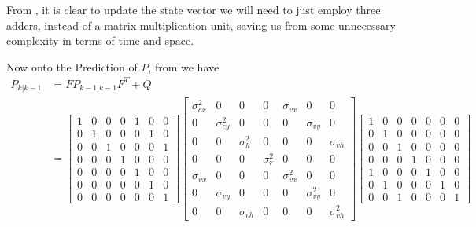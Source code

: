 \documentclass[10pt]{article}
\begin{document}
    \noindent From , it is clear to update the state vector we will need to just employ three adders, instead of 
    a matrix multiplication unit, saving us from some unnecessary complexity in terms of time and space.

    \noindent Now onto the Prediction of \(P\), from  we have
    \begin{align*}
        P_{k|k-1} &= FP_{k-1|k-1}F^T + Q  \\
        &=  \begin{bmatrix}
            1 & 0 & 0 & 0 & 1 & 0 & 0 \\
            0 & 1 & 0 & 0 & 0 & 1 & 0 \\
            0 & 0 & 1 & 0 & 0 & 0 & 1 \\
            0 & 0 & 0 & 1 & 0 & 0 & 0 \\
            0 & 0 & 0 & 0 & 1 & 0 & 0 \\
            0 & 0 & 0 & 0 & 0 & 1 & 0 \\
            0 & 0 & 0 & 0 & 0 & 0 & 1 
            \end{bmatrix}
            \begin{bmatrix}
                \sigma^2_{cx} & 0 & 0 & 0 & \sigma_{vx} & 0 & 0 \\
                0 & \sigma^2_{cy} & 0 & 0 & 0 & \sigma_{vy} & 0 \\
                0 & 0 & \sigma^2_h & 0 & 0 & 0 & \sigma_{vh} \\
                0 & 0 & 0 & \sigma^2_r & 0 & 0 & 0 \\
                \sigma_{vx} & 0 & 0 & 0 & \sigma^2_{vx} & 0 & 0 \\
                0 & \sigma_{vy} & 0 & 0 & 0 & \sigma^2_{vy} & 0 \\
                0 & 0 & \sigma_{vh} & 0 & 0 & 0 & \sigma^2_{vh}
            \end{bmatrix}
            \begin{bmatrix}
                1 & 0 & 0 & 0 & 0 & 0 & 0 \\
                0 & 1 & 0 & 0 & 0 & 0 & 0 \\
                0 & 0 & 1 & 0 & 0 & 0 & 0 \\
                0 & 0 & 0 & 1 & 0 & 0 & 0 \\
                1 & 0 & 0 & 0 & 1 & 0 & 0 \\
                0 & 1 & 0 & 0 & 0 & 1 & 0 \\
                0 & 0 & 1 & 0 & 0 & 0 & 1 

\end{bmatrix}
\end{align*}
\end{document}

